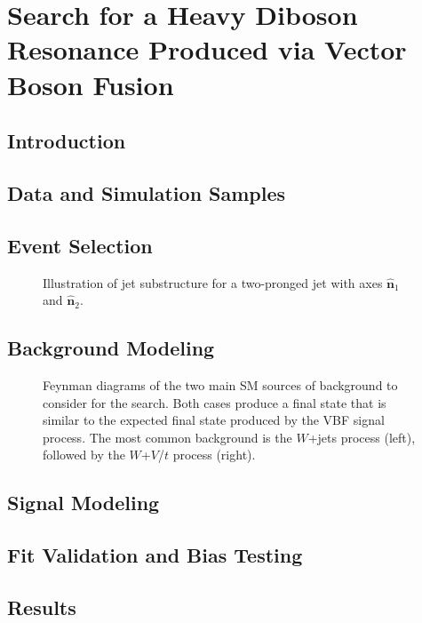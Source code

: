 
\chapter{Search for a Heavy Diboson Resonance Produced via Vector Boson Fusion}
\label{chap:search}

\section{Introduction}

\section{Data and Simulation Samples}
\label{sec:samples}

\section{Event Selection}
\label{sec:events}

\begin{figure}[htbp]
  \centering
  
  \caption{Illustration of jet substructure for a two-pronged jet with axes $\mathbf{\hat{n}}_1$ and $\mathbf{\hat{n}}_2$.}
  \label{fig:jet}
\end{figure}

\section{Background Modeling}
\label{sec:bkg}

\begin{figure}[htbp]
  \centering
  
  \caption{Feynman diagrams of the two main SM sources of background to consider for the search. Both cases produce a final state that is similar to the expected final state produced by the VBF signal process. The most common background is the $W$+jets process (left), followed by the $W$+$V$/$t$ process (right).}
  \label{fig:bkgFeynman}
\end{figure}

\section{Signal Modeling}
\label{sec:sig}

\section{Fit Validation and Bias Testing}
\label{sec:bias}

\section{Results}
\label{sec:results}
